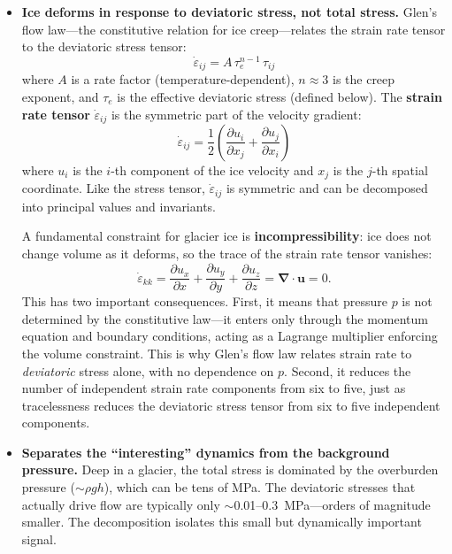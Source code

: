 \documentclass[11pt]{article}
\begin{document}
\begin{itemize}
  \item \textbf{Ice deforms in response to deviatoric stress, not total stress.}  Glen's flow law---the constitutive relation for ice creep---relates the strain rate tensor to the deviatoric stress tensor:
  \begin{equation}
    \dot{\varepsilon}_{ij} = A\,\tau_e^{n-1}\,\tau_{ij}
  \end{equation}
  where $A$ is a rate factor (temperature-dependent), $n \approx 3$ is the creep exponent, and $\tau_e$ is the effective deviatoric stress (defined below).  The \textbf{strain rate tensor} $\dot{\varepsilon}_{ij}$ is the symmetric part of the velocity gradient:
  \begin{equation}
    \dot{\varepsilon}_{ij} = \frac{1}{2}\left(\frac{\partial u_i}{\partial x_j} + \frac{\partial u_j}{\partial x_i}\right)
  \end{equation}
  where $u_i$ is the $i$-th component of the ice velocity and $x_j$ is the $j$-th spatial coordinate.  Like the stress tensor, $\dot{\varepsilon}_{ij}$ is symmetric and can be decomposed into principal values and invariants.

  A fundamental constraint for glacier ice is \textbf{incompressibility}: ice does not change volume as it deforms, so the trace of the strain rate tensor vanishes:
  \begin{equation}
    \dot{\varepsilon}_{kk} = \frac{\partial u_x}{\partial x} + \frac{\partial u_y}{\partial y} + \frac{\partial u_z}{\partial z} = \bm{\nabla} \cdot \bm{u} = 0.
  \end{equation}
  This has two important consequences.  First, it means that pressure $p$ is not determined by the constitutive law---it enters only through the momentum equation and boundary conditions, acting as a Lagrange multiplier enforcing the volume constraint.  This is why Glen's flow law relates strain rate to \emph{deviatoric} stress alone, with no dependence on $p$.  Second, it reduces the number of independent strain rate components from six to five, just as tracelessness reduces the deviatoric stress tensor from six to five independent components.

  \item \textbf{Separates the ``interesting'' dynamics from the background pressure.}  Deep in a glacier, the total stress is dominated by the overburden pressure ($\sim \rho g h$), which can be tens of MPa.  The deviatoric stresses that actually drive flow are typically only $\sim$0.01--0.3~MPa---orders of magnitude smaller.  The decomposition isolates this small but dynamically important signal.
\end{itemize}
\end{document}
